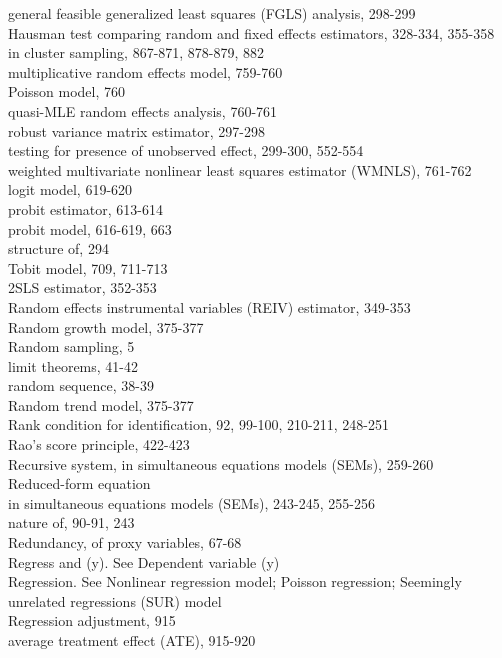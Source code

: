 \documentclass[10pt]{article}
\begin{document}
general feasible generalized least squares (FGLS) analysis, 298-299\\
Hausman test comparing random and fixed effects estimators, 328-334, 355-358\\
in cluster sampling, 867-871, 878-879, 882\\
multiplicative random effects model, 759-760\\
Poisson model, 760\\
quasi-MLE random effects analysis, 760-761\\
robust variance matrix estimator, 297-298\\
testing for presence of unobserved effect, 299-300, 552-554\\
weighted multivariate nonlinear least squares estimator (WMNLS), 761-762\\
logit model, 619-620\\
probit estimator, 613-614\\
probit model, 616-619, 663\\
structure of, 294\\
Tobit model, 709, 711-713\\
2SLS estimator, 352-353\\
Random effects instrumental variables (REIV) estimator, 349-353\\
Random growth model, 375-377\\
Random sampling, 5\\
limit theorems, 41-42\\
random sequence, 38-39\\
Random trend model, 375-377\\
Rank condition for identification, 92, 99-100, 210-211, 248-251\\
Rao's score principle, 422-423\\
Recursive system, in simultaneous equations models (SEMs), 259-260\\
Reduced-form equation\\
in simultaneous equations models (SEMs), 243-245, 255-256\\
nature of, 90-91, 243\\
Redundancy, of proxy variables, 67-68\\
Regress and (y). See Dependent variable (y)\\
Regression. See Nonlinear regression model; Poisson regression; Seemingly unrelated regressions (SUR) model\\
Regression adjustment, 915\\
average treatment effect (ATE), 915-920\\
\end{document}
